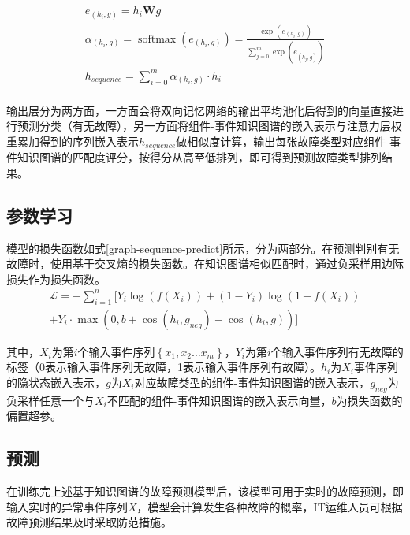 \begin{equation}
    \begin{array}{l}
    e_{(h_{i} , g)} = h_{i}\mathbf{W}g\\
    \alpha_{(h_{i} , g)}=\operatorname{softmax}\left(e_{(h_{i} , g)}\right)=\frac{\exp \left(e_{(h_{i} , g)}\right)}{\sum_{j=0}^{m}  \exp \left(e_{\left(h_{j} , g\right )}\right)}\\
    h_{sequence} = \sum_{i=0}^{m}\alpha_{(h_{i} , g)}\cdot h_{i}\\
    \end{array}
    \label{sequence-hidden}
\end{equation}

输出层分为两方面，一方面会将双向记忆网络的输出平均池化后得到的向量直接进行预测分类（有无故障），另一方面将组件-事件知识图谱的嵌入表示与注意力层权重累加得到的序列嵌入表示$h_{sequence}$做相似度计算，输出每张故障类型对应组件-事件知识图谱的匹配度评分，按得分从高至低排列，即可得到预测故障类型排列结果。

\subsection{参数学习}
模型的损失函数如式\ref{graph-sequence-predict}所示，分为两部分。在预测判别有无故障时，使用基于交叉熵的损失函数。在知识图谱相似匹配时，通过负采样用边际损失作为损失函数。
\begin{equation}
    \begin{aligned}
        \mathcal{L}=-\sum_{i=1}^{n}[Y_{i} \log \left(f\left(X_{i} \right)\right)
        +\left(1-Y_{i}\right) \log \left(1-f\left(X_{i} \right)\right)\\
+Y_{i}\cdot \max \left (0, b +\cos \left (h_{i},  g_{neg} \right ) - \cos \left (h_{i}, g \right )\right )]
    \end{aligned}
    \label{graph-sequence-predict}
\end{equation}

其中，$X_{i}$为第$i$个输入事件序列$\left\{x_{1}, x_{2} \ldots x_{m}\right\}$，$Y_{i}$为第$i$个输入事件序列有无故障的标签（0表示输入事件序列无故障，1表示输入事件序列有故障）。$h_{i}$为$X_{i}$事件序列的隐状态嵌入表示，$g$为$X_{i}$对应故障类型的组件-事件知识图谱的嵌入表示，$g_{neg}$为负采样任意一个与$X_{i}$不匹配的组件-事件知识图谱的嵌入表示向量，$b$为损失函数的偏置超参。

\subsection{预测}
在训练完上述基于知识图谱的故障预测模型后，该模型可用于实时的故障预测，即输入实时的异常事件序列$X$，模型会计算发生各种故障的概率，IT运维人员可根据故障预测结果及时采取防范措施。

